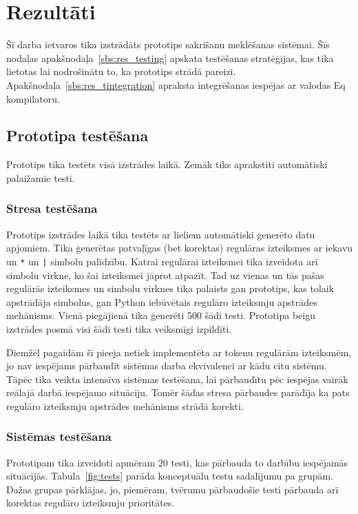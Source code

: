 \section{Rezultāti}

Šī darba ietvaros tika izstrādāts prototips sakrišanu meklēšanas sistēmai. Šīs nodaļas apakšnodaļa~\ref{sbs:res_testing} apskata testēšanas stratēģijas, kas tika lietotas lai nodrošinātu to, ka prototips strādā pareizi. Apakšnodaļa~\ref{sbs:res_tintegration} apraksta integrēšanas iespējas ar valodas Eq kompilatoru.

\subsection{\label{sbs:res_testing}Prototipa testēšana}

Prototips tika testēts visā izstrādes laikā. Zemāk tiks aprakstīti automātiski palaižamie testi. 

\subsubsection{Stresa testēšana}

Prototips izstrādes laikā tika testēts ar lieliem automātiski ģenerēto datu apjomiem. Tika ģenerētas patvaļīgas (bet korektas) regulāras izteiksmes ar iekavu un \verb|*| un \verb/|/ simbolu palīdzību. Katrai regulārai izteiksmei tika izveidota arī simbolu virkne, ko šai izteiksmei jāprot atpazīt. Tad uz vienas un tās pašas regulārās izteiksmes un simbolu virknes tika palaists gan prototips, kas tolaik apstrādāja simbolus, gan Python iebūvētais regulāro izteiksmju apstrādes mehānisms. Vienā piegājienā tika ģenerēti 500 šādi testi. Prototipa beigu izstrādes posmā visi šādi testi tika veiksmīgi izpildīti.

Diemžēl pagaidām šī pieeja netiek implementēta ar tokenu regulārām izteiksmēm, jo nav iespējams pārbaudīt sistēmas darba ekvivalenci ar kādu citu sistēmu. Tāpēc tika veikta intensīva sistēmas testēšana, lai pārbaudītu pēc iespējas vairāk reālajā darbā iespējamo situāciju. Tomēr šādas stresa pārbaudes parādīja ka pats regulāro izteiksmju apstrādes mehānisms strādā korekti.

\subsubsection{Sistēmas testēšana}

Prototipam tika izveidoti apmēram 20 testi, kas pārbauda to darbību iespējamās situācijās. Tabula~\ref{fig:tests} parāda konceptuālu testu sadalījumu pa grupām. Dažas grupas pārklājas, jo, piemēram, tvērumu pārbaudošie testi pārbauda arī korektas regulāro izteiksmju prioritātes.

